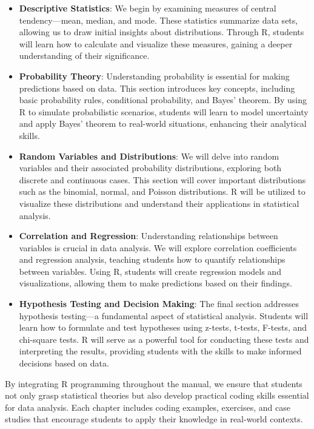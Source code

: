 \documentclass[10pt]{book}
\begin{document}
\begin{itemize}
    \item \textbf{Descriptive Statistics}: We begin by examining measures of central tendency—mean, median, and mode. These statistics summarize data sets, allowing us to draw initial insights about distributions. Through R, students will learn how to calculate and visualize these measures, gaining a deeper understanding of their significance.
    
    \item \textbf{Probability Theory}: Understanding probability is essential for making predictions based on data. This section introduces key concepts, including basic probability rules, conditional probability, and Bayes’ theorem. By using R to simulate probabilistic scenarios, students will learn to model uncertainty and apply Bayes’ theorem to real-world situations, enhancing their analytical skills.
    
    \item \textbf{Random Variables and Distributions}: We will delve into random variables and their associated probability distributions, exploring both discrete and continuous cases. This section will cover important distributions such as the binomial, normal, and Poisson distributions. R will be utilized to visualize these distributions and understand their applications in statistical analysis.
    
    \item \textbf{Correlation and Regression}: Understanding relationships between variables is crucial in data analysis. We will explore correlation coefficients and regression analysis, teaching students how to quantify relationships between variables. Using R, students will create regression models and visualizations, allowing them to make predictions based on their findings.
    
    \item \textbf{Hypothesis Testing and Decision Making}: The final section addresses hypothesis testing—a fundamental aspect of statistical analysis. Students will learn how to formulate and test hypotheses using z-tests, t-tests, F-tests, and chi-square tests. R will serve as a powerful tool for conducting these tests and interpreting the results, providing students with the skills to make informed decisions based on data.
\end{itemize}

By integrating R programming throughout the manual, we ensure that students not only grasp statistical theories but also develop practical coding skills essential for data analysis. Each chapter includes coding examples, exercises, and case studies that encourage students to apply their knowledge in real-world contexts.
\end{document}
